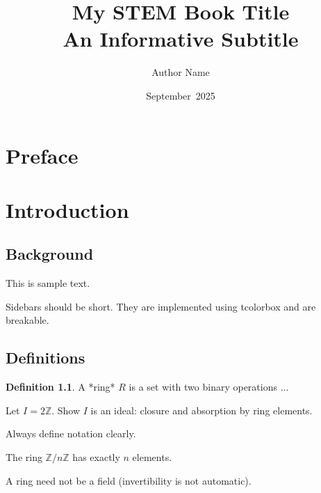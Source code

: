 \documentclass[12pt,oneside]{book}
\newcommand{\BookTitle}{My STEM Book Title}
\newcommand{\BookSubtitle}{An Informative Subtitle}
\newcommand{\AuthorName}{Author Name}
\newcommand{\RevisionDate}{September~2025}
\theoremstyle{definition}
\newtheorem{definition}[theorem]{Definition}
\theoremstyle{remark}
\begin{document}
\frontmatter
\title{\BookTitle\\[1ex]\large\BookSubtitle}
\author{\AuthorName}
\date{\RevisionDate}
\maketitle

\chapter*{Preface}

\tableofcontents
\listoffigures
\listoftables







\mainmatter
\chapter{Introduction}
\section{Background}

This is sample text.


\begin{sidebarbox}
Sidebars should be short. They are implemented using tcolorbox and are breakable.
\end{sidebarbox}

\section{Definitions}
\begin{definition}
A *ring* \(R\) is a set with two binary operations ...
\end{definition}

\begin{workedexample}
Let \(I=2\mathbb{Z}\). Show $I$ is an ideal: closure and absorption by ring elements.
\end{workedexample}

\begin{TipBox}
Always define notation clearly.
\end{TipBox}
\begin{InfoBox}
The ring $\mathbb{Z}/n\mathbb{Z}$ has exactly $n$ elements.
\end{InfoBox}
\begin{WarningBox}
A ring need not be a field (invertibility is not automatic).
\end{WarningBox}
\end{document}
